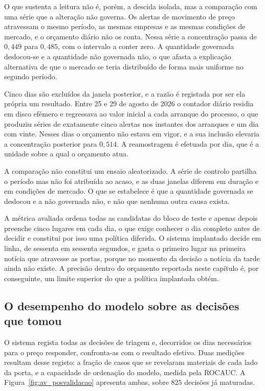 O que sustenta a leitura não é, porém, a descida isolada, mas a comparação com uma série que a
alteração não governa. Os alertas de movimento de preço atravessam o mesmo período, as mesmas
empresas e as mesmas condições de mercado, e o orçamento diário não os conta. Nessa série a
concentração passa de $0{,}449$ para $0{,}485$, com o intervalo a conter zero. A quantidade
governada deslocou-se e a quantidade não governada não, o que afasta a explicação alternativa
de que o mercado se teria distribuído de forma mais uniforme no segundo período.

Cinco dias são excluídos da janela posterior, e a razão é registada por ser ela própria um
resultado. Entre 25 e 29 de agosto de 2026 o contador diário residia em disco efémero e
regressava ao valor inicial a cada arranque do processo, o que produziu séries de exatamente
cinco alertas nos instantes dos arranques e um dia com vinte. Nesses dias o orçamento não estava
em vigor, e a sua inclusão elevaria a concentração posterior para $0{,}514$. A reamostragem é
efetuada por dia, que é a unidade sobre a qual o orçamento atua.

A comparação não constitui um ensaio aleatorizado. A série de controlo partilha o período mas não
foi atribuída ao acaso, e as duas janelas diferem em duração e em condições de mercado. O que se
estabelece é que a quantidade governada se deslocou e a não governada não, e não que nenhuma
outra causa exista.

A métrica avaliada ordena todas as candidatas do bloco de
teste e apenas depois preenche cinco lugares em cada dia, o que exige conhecer o dia completo antes
de decidir e constitui por isso uma política diferida. O sistema implantado decide em linha, de
sessenta em sessenta segundos, e gasta o primeiro lugar na primeira notícia que atravesse as portas,
porque no momento da decisão a notícia da tarde ainda não existe. A precisão dentro do orçamento
reportada neste capítulo é, por conseguinte, um limite superior do que a política implantada obtém.

\subsection{O desempenho do modelo sobre as decisões que tomou}

O sistema regista todas as decisões de triagem e, decorridos os dias necessários para o preço
responder, confronta-as com o resultado efetivo. Duas medições resultam desse registo: a fração de
casos que se revelaram materiais de cada lado da porta, e a capacidade de ordenação do modelo,
medida pela \gls{ROCAUC}. A Figura~\ref{fig:av_posvalidacao} apresenta ambas, sobre $825$ decisões
já maturadas.

